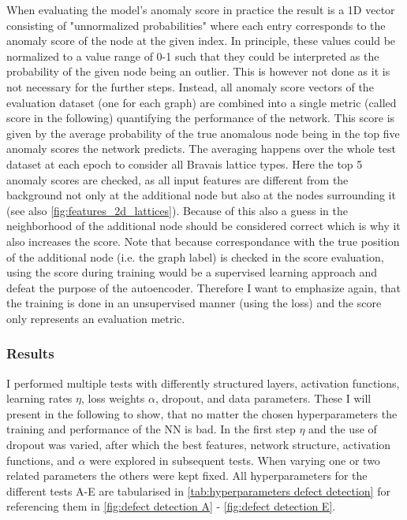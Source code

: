 \documentclass[11pt,a4paper]{article}
\begin{document}
When evaluating the model's anomaly score in practice the result is a 1D vector consisting of "unnormalized probabilities" where each entry corresponds to the anomaly score of the node at the given index. 
In principle, these values could be normalized to a value range of 0-1 such that they could be interpreted as the probability of the given node being an outlier. 
This is however not done as it is not necessary for the further steps. 
Instead, all anomaly score vectors of the evaluation dataset (one for each graph) are combined into a single metric (called score in the following) quantifying the performance of the network. 
This score is given by the average probability of the true anomalous node being in the top five anomaly scores the network predicts. 
The averaging happens over the whole test dataset at each epoch to consider all Bravais lattice types. 
Here the top 5 anomaly scores are checked, as all input features are different from the background not only at the additional node but also at the nodes surrounding it (see also \autoref{fig:features_2d_lattices}). 
Because of this also a guess in the neighborhood of the additional node should be considered correct which is why it also increases the score. 
Note that because correspondance with the true position of the additional node (i.e. the graph label) is checked in the score evaluation, using the score during training would be a supervised learning approach and defeat the purpose of the autoencoder. 
Therefore I want to emphasize again, that the training is done in an unsupervised manner (using the loss) and the score only represents an evaluation metric. 


\subsubsection{Results}
I performed multiple tests with differently structured layers, activation functions, learning rates $\eta$, loss weights $\alpha$, dropout, and data parameters. 
These I will present in the following to show, that no matter the chosen hyperparameters the training and performance of the NN is bad. 
In the first step $\eta$ and the use of dropout was varied, after which the best features, network structure, activation functions, and $\alpha$ were explored in subsequent tests. 
When varying one or two related parameters the others were kept fixed. 
All hyperparameters for the different tests A-E are tabularised in \autoref{tab:hyperparameters defect detection} for referencing them in \autoref{fig:defect detection A} - \autoref{fig:defect detection E}. 
\end{document}
